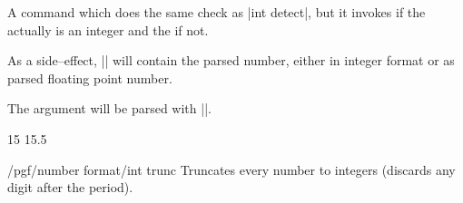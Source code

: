 \begin{command}{\pgfmathifisint{}}
	A command which does the same check as |int detect|, but it invokes  if the  actually is an integer and the  if not.

	As a side--effect, |\pgfretval| will contain the parsed number, either in integer format or as parsed floating point number.

	The argument  will be parsed with |\pgfmathfloatparsenumber|. 
\begin{codeexample}[]
15 \hspace{1em}
15.5 
\end{codeexample}
\end{command}

\begin{key}{/pgf/number format/int trunc}
Truncates every number to integers (discards any digit after the period).

\begin{codeexample}[]
\hspace{1em}
\hspace{1em}
\hspace{1em}
\hspace{1em}
\end{codeexample}
\end{key}


